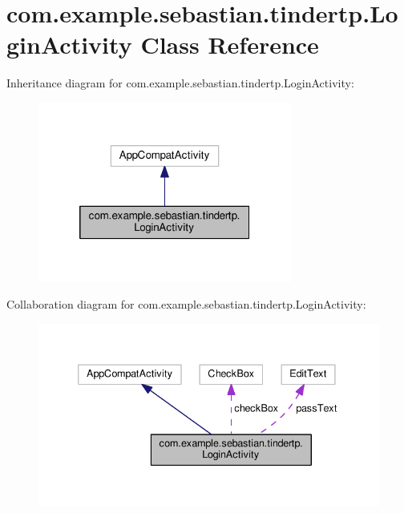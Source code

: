 \hypertarget{classcom_1_1example_1_1sebastian_1_1tindertp_1_1LoginActivity}{}\section{com.\+example.\+sebastian.\+tindertp.\+Login\+Activity Class Reference}
\label{classcom_1_1example_1_1sebastian_1_1tindertp_1_1LoginActivity}


Inheritance diagram for com.\+example.\+sebastian.\+tindertp.\+Login\+Activity\+:\nopagebreak
\begin{figure}[H]
\begin{center}
\leavevmode
\includegraphics[width=236pt]{classcom_1_1example_1_1sebastian_1_1tindertp_1_1LoginActivity__inherit__graph}
\end{center}
\end{figure}


Collaboration diagram for com.\+example.\+sebastian.\+tindertp.\+Login\+Activity\+:\nopagebreak
\begin{figure}[H]
\begin{center}
\leavevmode
\includegraphics[width=335pt]{classcom_1_1example_1_1sebastian_1_1tindertp_1_1LoginActivity__coll__graph}
\end{center}
\end{figure}
